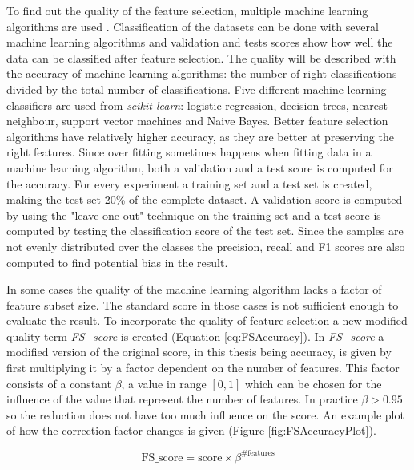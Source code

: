 \documentclass[10pt,a4paper]{report}
\begin{document}
	To find out the quality of the feature selection, multiple machine learning algorithms are used \cite{hall1998practical}.  Classification of the datasets can be done with several machine learning algorithms and validation and tests scores show how well the data can be classified after feature selection. The quality will be described with the accuracy of machine learning algorithms: the number of right classifications divided by the total number of classifications. Five different machine learning classifiers are used from \textit{scikit-learn}: logistic regression, decision trees, nearest neighbour, support vector machines and Naive Bayes. Better feature selection algorithms have relatively higher accuracy, as they are better at preserving the right features. Since over fitting sometimes happens when fitting data in a machine learning algorithm, both a validation and a test score is computed for the accuracy. For every experiment a training set and a test set is created, making the test set 20\% of the complete dataset. A validation score is computed by using the "leave one out" technique on the training set and a test score is computed by testing the classification score of the test set. Since the samples are not evenly distributed over the classes the precision, recall and F1 scores are also computed to find potential bias in the result.
	
	In some cases the quality of the machine learning algorithm lacks a factor of feature subset size. The standard score in those cases is not sufficient enough to evaluate the result. To incorporate the quality of feature selection a new modified quality term \textit{FS\_score} is created (Equation \ref{eq:FSAccuracy}). In \textit{FS\_score} a modified version of the original score, in this thesis being accuracy, is given by first multiplying it by a factor dependent on the number of features. This factor consists of a constant $\beta$, a value in range $[0, 1]$ which can be chosen for the influence of the  value that represent the number of features. In practice $\beta > 0.95$ so the reduction does not have too much influence on the score. An example plot of how the correction factor changes is given (Figure \ref{fig:FSAccuracyPlot}).
	
	\begin{equation*}
	\label{eq:FSAccuracy}
	\text{FS\_score} = \text{score} \times \beta^{\text{\#features}}
	\end{equation*}
	
\end{document}
